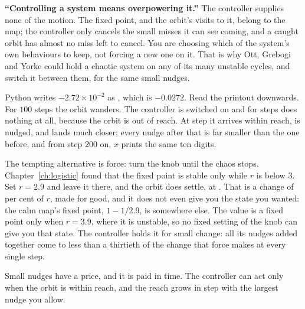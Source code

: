 \begin{trapbox}
\textbf{\enquote{Controlling a system means overpowering it.}} The controller
supplies none of the motion. The fixed point, and the orbit's visits to it,
belong to the map; the controller only cancels the small misses it can see
coming, and a caught orbit has almost no miss left to cancel. You are
choosing which of the system's own behaviours to keep, not forcing a new one
on it. That is why Ott, Grebogi and Yorke could hold a chaotic system on any
of its many unstable cycles, and switch it between them, for the same small
nudges.
\end{trapbox}



\noindent
Python writes $-\num{2.72} \times 10^{-2}$ as , which is
$-\num{0.0272}$. Read the printout downwards. For $100$ steps the orbit
wanders. The controller is switched on and for  steps does
nothing at all, because the orbit is out of reach. At step  it
arrives within reach, is nudged, and lands much closer; every nudge after
that is far smaller than the one before, and from step $200$ on, $x$ prints
the same ten digits.


The tempting alternative is force: turn the knob until the chaos stops.
Chapter~\ref{ch:logistic} found that the fixed point is stable only while $r$
is below $3$. Set $r = \num{2.9}$ and leave it there, and the orbit does
settle, at . That is a change of 
per cent of $r$, made for good, and it does not even give you the state you
wanted: the calm map's fixed point, $1 - 1/\num{2.9}$, is somewhere else. The
value  is a fixed point only when $r = \num{3.9}$, where it is
unstable, so no fixed setting of the knob can give you that state. The
controller holds it for small change: all its nudges added together come to
less than a thirtieth of the change that force makes at every single step.

Small nudges have a price, and it is paid in time. The controller can act
only when the orbit is within reach, and the reach grows in step with the
largest nudge you allow.

